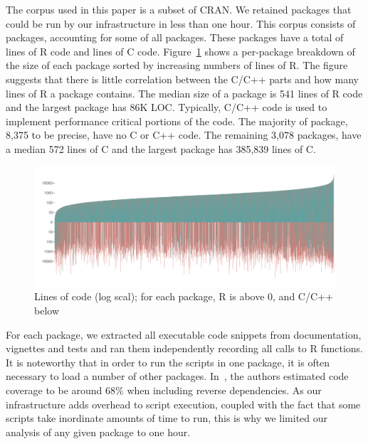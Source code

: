 \documentclass[acmsmall,10pt,review,anonymous]{acmart}\settopmatter{printfolios=true,printccs=false,printacmref=false}
\begin{document}
The corpus used in this paper is a subset of CRAN. We retained packages that
could be run by our infrastructure in less than one hour. This corpus
consists of \PACKAGES packages, accounting for some \PERCENTCRAN of all
packages.  These packages have a total of \RLOC lines of R code and \CLOC
lines of C code. Figure~\ref{allcloc} shows a per-package breakdown of the
size of each package sorted by increasing numbers of lines of R. The figure
suggests that there is little correlation between the C/C++ parts and how
many lines of R a package contains. The median size of a package is 541
lines of R code and the largest package has 86K LOC. Typically, C/C++ code
is used to implement performance critical portions of the code. The majority
of package, 8,375 to be precise, have no C or C++ code.  The remaining 3,078
packages, have a median 572 lines of C and the largest package has 385,839
lines of C.

\begin{figure}[!b]\begin{center}
\includegraphics[width=.9\textwidth]{linesofrandccode}
\caption{Lines of code (log scal); for each package, R is above 0, and C/C++
  below}\label{allcloc}\end{center}
\end{figure}


For each package, we extracted all executable code snippets from
documentation, vignettes and tests and ran them independently recording all
calls to R functions.  It is noteworthy that in order to run the scripts in
one package, it is often necessary to load a number of other packages.
In~\cite{issta18}, the authors estimated code coverage to be around 68\%
when including reverse dependencies.  As our infrastructure adds overhead to
script execution, coupled with the fact that some scripts take inordinate
amounts of time to run, this is why we limited our analysis of any given
package to one hour.
\end{document}
